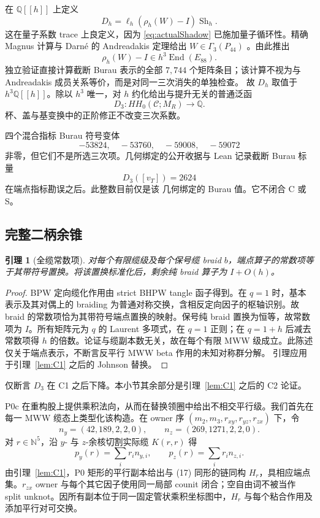 \documentclass[11pt]{amsart}
\newtheorem{lemma}[theorem]{引理}
\theoremstyle{definition}
\theoremstyle{remark}
\newcommand{\Q}{\mathbb{Q}}
\begin{document}
在 $\Q[[h]]$ 上定义
\[
D_h=\ell_h(\rho_h(W)-I)\operatorname{Sh}_h.
\]
这在量子系数 trace 上良定义，因为 \eqref{eq:actualShadow} 已施加量子循环性。精确 Magnus 计算与 Darn\'e 的 Andreadakis 定理给出 $W\in\Gamma_3(P_{44})$ \cite[Theorem~6.2]{Darne2021}。由此推出
\[
\rho_h(W)-I\in h^3\operatorname{End}(E_{88}).
\]
独立验证直接计算截断 Burau 表示的全部 $7{,}744$ 个矩阵条目；该计算不视为与 Andreadakis 成员关系等价，而是对同一三次消失的单独检查。
故 $D_h$ 取值于 $h^3\Q[[h]]$。除以 $h^3$ 唯一，对 $h$ 约化给出与提升无关的普通泛函
\[
D_3:HH_0(\mathcal C;M_R)\longrightarrow\Q.
\]
杯、盖与基变换中的正阶修正不改变三次系数。

四个混合指标 Burau 符号变体
\[
-53824,\quad -53760,\quad -59008,\quad -59072
\]
非零，但它们不是所选三次项。几何绑定的公开收据与
Lean 记录截断 Burau 标量
\begin{equation}\label{eq:selectedD3}
D_3([v_T])=2624
\end{equation}
在端点指标勘误之后。此整数目前仅是该
几何绑定的 Burau 值。它不闭合 C 或 S。

\subsection{完整二柄余锥}

\begin{lemma}[全缆常数项]\label{lem:C2}
对每个有限缆级及每个保号缆 braid \(b\)，端点算子的常数项等于其带符号置换。将该置换标准化后，剩余纯 braid 算子为 \(I+O(h)\)。
\end{lemma}

\begin{proof}
BPW 定向缆化作用由 strict BHPW tangle 函子得到。在 \(q=1\) 时，基本表示及其对偶上的 braiding 为普通对称交换，含相反定向因子的枢轴识别。故 braid 的常数项恰为其带符号端点置换的映射。保号纯 braid 置换为恒等，故常数项为 \(I\)。所有矩阵元为 \(q\) 的 Laurent 多项式，在 \(q=1\) 正则；在 \(q=1+h\) 后减去常数项得 \(h\) 的倍数。论证与缆副本数无关，故在每个有限 MWW 级成立。此陈述仅关于端点表示，不断言反平行 MWW beta 作用的未知对称群分解。
引理应用于引理~\ref{lem:C1} 之后的 Johnson 替换。
\end{proof}

仅断言 $D_3$ 在 C1 之后下降。本小节其余部分是引理~\ref{lem:C1} 之后的 C2 论证。

P0c 在重构股上提供乘积法向，从而在替换领圈中给出不相交平行级。我们首先在每一 MWW 缆态上类型化该构造。在 owner 序 $(m_2,m_3,r_{xy},r_{yz},r_{zx})$ 下，令
\[
n_y=(42,189,2,2,0),\qquad n_z=(269,1271,2,2,0).
\]
对 $r\in\mathbb N^5$，沿 $y$- 与 $z$-余核切割实际缆 $K(r,r)$ 得
\[
p_y(r)=\sum_i r_i n_{y,i},\qquad
p_z(r)=\sum_i r_i n_{z,i}.
\tag{24}
\]
由引理~\ref{lem:C1}，P0 矩形的平行副本给出与 (17) 同形的链同构 $H_r$，具相应端点集。$r_{zx}$ owner 与每个其它因子使用同一局部 counit 闭合；空自由词不被当作 split unknot。因所有副本位于同一固定管状乘积坐标图中，$H_r$ 与每个粘合作用及添加平行对可交换。
\end{document}
